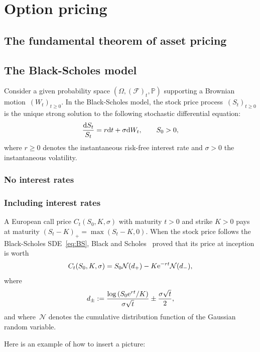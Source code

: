 \section{Option pricing}
\subsection{The fundamental theorem of asset pricing}

\subsection{The Black-Scholes model}
Consider a given probability space $(\Omega, (\mathcal{F})_t,\mathbb{P})$ 
supporting a Brownian motion~$(W_t)_{t\geq 0}$.
In the Black-Scholes model, the stock price process~$(S_t)_{t\geq 0}$ is the unique strong solution to
the following stochastic differential equation:
\begin{equation}\label{eq:BS}
\frac{\mathrm{d} S_t}{S_t} = r \mathrm{d} t + \sigma \mathrm{d} W_t,
\qquad S_0>0,
\end{equation}
where $r\geq 0$ denotes the instantaneous risk-free interest rate and $\sigma>0$ the instantaneous volatility.

\subsubsection{No interest rates}
\subsubsection{Including interest rates}
A European call price $C_t(S_0,K,\sigma)$ with maturity $t>0$ and strike $K>0$ 
pays at maturity $(S_t-K)_+=\max(S_t-K,0)$. 
When the stock price follows the Black-Scholes SDE~\eqref{eq:BS}, 
Black and Scholes~\cite{blackholes} proved that its price at inception is worth
$$
C_t(S_0,K,\sigma) = S_0\mathcal{N}(d_+) - K\mathrm{e}^{-rt}\mathcal{N}(d_-),
$$
where
$$
d_{\pm} := \frac{\log\left(S_0 \mathrm{e}^{rt}/K\right)}{\sigma\sqrt{t}} \pm \frac{\sigma\sqrt{t}}{2},
$$
and where~$\mathcal{N}$ denotes the cumulative distribution function of the Gaussian random variable.

Here is an example of how to insert a picture:

